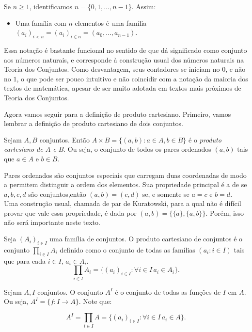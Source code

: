 \begin{exemplo}
    Se $n\geq 1$, identificamos $n=\{0, 1, \dots, n-1\}$.
    Assim:
    \begin{itemize}
    \item Uma família com $n$ elementos é uma família $(a_i)_{i<n}=(a_i)_{i \in n}=(a_0, \dots, a_{n-1})$.
    \end{itemize}

    Essa notação é bastante funcional no sentido de que dá significado como conjunto aos números naturais, e corresponde à construção usual dos números naturais na Teoria dos Conjuntos.
    Como desvantagem, seus contadores se iniciam no $0$, e não no $1$, o que pode ser pouco intuitivo e não coincidir com a notação da maioria dos textos de matemática, apesar de ser muito adotada em textos mais próximos de Teoria dos Conjuntos.
\end{exemplo}

Agora vamos seguir para a definição de produto cartesiano.
Primeiro, vamos lembrar a definição de produto cartesiano de dois conjuntos.

\begin{definition}
    Sejam $A, B$ conjuntos. Então $A\times B=\{(a, b): a\in A, b \in B\}$ é o \emph{produto cartesiano de $A$ e $B$}.
    Ou seja, o conjunto de todos os pares ordenados $(a, b)$ tais que $a\in A$ e $b\in B$.
\end{definition}

Pares ordenados são conjuntos especiais que carregam duas coordenadas de modo a permitem distinguir a ordem dos elementos. Sua propriedade principal é a de se $a, b, c, d$ são conjuntos,então $(a, b)=(c, d)$ se, e somente se $a=c$ e $b=d$. Uma construção usual, chamada de par de Kuratowski, para a qual não é difícil provar que vale essa propriedade, é dada por $(a, b)=\{\{a\}, \{a, b\}\}$. Porém, isso não será importante neste texto.


\begin{definition}
Seja $(A_i)_{i \in I}$ uma família de conjuntos. O produto cartesiano de conjuntos é o conjunto $\prod_{i \in I} A_i$ definido como o conjunto de todas as famílias $(a_i: i \in I)$ tais que para cada $i \in I$, $a_i \in A_i$.
$$\prod_{i \in I} A_i=\{(a_i)_{i \in I}: \forall i \in I\, a_i \in A_i\}.$$
\end{definition}


\begin{definition}
    Sejam $A, I$ conjuntos. O conjunto $A^I$ é o conjunto de todas as funções de $I$ em $A$. Ou seja, $A^I=\{f:I\rightarrow A\}$. Note que:

    $$A^I=\prod_{i \in I}A=\{(a_i)_{i \in I}: \forall i \in I\,  a_i\in A\}.$$
    \end{definition}

